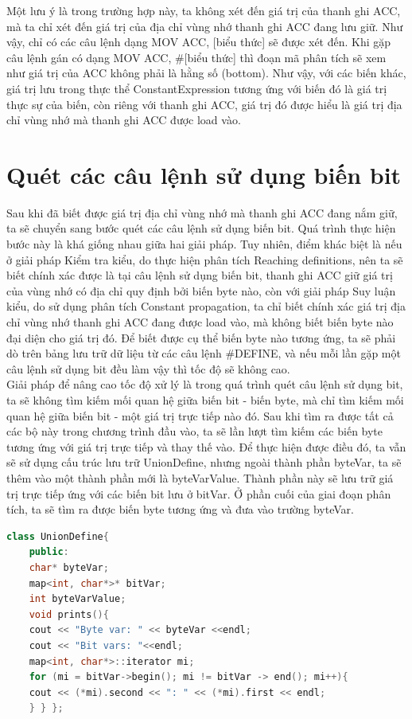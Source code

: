 Một lưu ý là trong trường hợp này, ta không xét đến giá trị của thanh ghi ACC, mà ta chỉ xét đến giá trị của địa chỉ vùng nhớ thanh ghi ACC đang lưu giữ. Như vậy, chỉ có các câu lệnh dạng MOV ACC, [biểu thức] sẽ được xét đến. Khi gặp câu lệnh gán có dạng MOV ACC, \#[biểu thức] thì đoạn mã phân tích sẽ xem như giá trị của ACC không phải là hằng số (bottom). Như vậy, với các biến khác, giá trị lưu trong thực thể ConstantExpression tương ứng với biến đó là giá trị thực sự của biến, còn riêng với thanh ghi ACC, giá trị đó được hiểu là giá trị địa chỉ vùng nhớ mà thanh ghi ACC được load vào.
\section{Quét các câu lệnh sử dụng biến bit}

Sau khi đã biết được giá trị địa chỉ vùng nhớ mà thanh ghi ACC đang nắm giữ, ta sẽ chuyển sang bước quét các câu lệnh sử dụng biến bit. Quá trình thực hiện bước này là khá giống nhau giữa hai giải pháp. Tuy nhiên, điểm khác biệt là nếu ở giải pháp Kiểm tra kiểu, do thực hiện phân tích Reaching definitions, nên ta sẽ biết chính xác được là tại câu lệnh sử dụng biến bit, thanh ghi ACC giữ giá trị của vùng nhớ có địa chỉ quy định bởi biến byte nào, còn với giải pháp Suy luận kiểu, do sử dụng phân tích Constant propagation, ta chỉ biết chính xác giá trị địa chỉ vùng nhớ thanh ghi ACC đang được load vào, mà không biết biến byte nào đại diện cho giá trị đó. Để biết được cụ thể biến byte nào tương ứng, ta sẽ phải dò trên bảng lưu trữ dữ liệu từ các câu lệnh \#DEFINE, và nếu mỗi lần gặp một câu lệnh sử dụng bit đều làm vậy thì tốc độ sẽ không cao.\\

Giải pháp để nâng cao tốc độ xử lý là trong quá trình quét câu lệnh sử dụng bit, ta sẽ không tìm kiếm mối quan hệ giữa biến bit - biến byte, mà chỉ tìm kiếm mối quan hệ giữa biến bit - một giá trị trực tiếp nào đó. Sau khi tìm ra được tất cả các bộ này trong chương trình đầu vào, ta sẽ lần lượt tìm kiếm các biến byte tương ứng với giá trị trực tiếp và thay thế vào. Để thực hiện được điều đó, ta vẫn sẽ sử dụng cấu trúc lưu trữ UnionDefine, nhưng ngoài thành phần byteVar, ta sẽ thêm vào một thành phần mới là byteVarValue. Thành phần này sẽ lưu trữ giá trị trực tiếp ứng với các biến bit lưu ở bitVar. Ở phần cuối của giai đoạn phân tích, ta sẽ tìm ra được biến byte tương ứng và đưa vào trường byteVar.\\

\begin{lstlisting}[caption={Đoạn mã mới của class UnionDefine},label={list:listnewuniondefine},language=c++]
	class UnionDefine{
	public:
	char* byteVar;
	map<int, char*>* bitVar;
	int byteVarValue;
	void prints(){
	cout << "Byte var: " << byteVar <<endl;
	cout << "Bit vars: "<<endl;
	map<int, char*>::iterator mi;
	for (mi = bitVar->begin(); mi != bitVar -> end(); mi++){
	cout << (*mi).second << ": " << (*mi).first << endl;
	} } };
\end{lstlisting}

